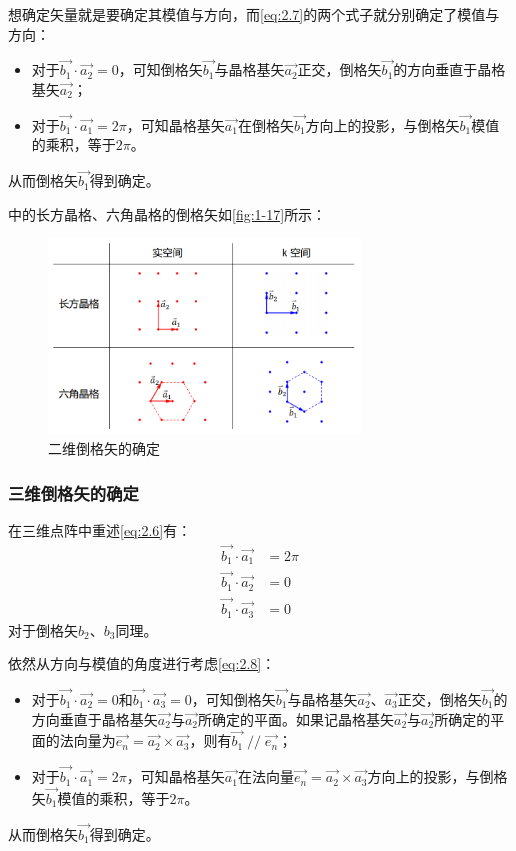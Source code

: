     想确定矢量就是要确定其模值与方向，而\autoref{eq:2.7}的两个式子就分别确定了模值与方向：
    \begin{itemize}[itemsep=0pt,parsep=0pt]
        \item 对于$\vec{b_1} \cdot \vec{a_2} = 0$，可知倒格矢$\vec{b_1}$与晶格基矢$\vec{a_2}$正交，倒格矢$\vec{b_1}$的方向垂直于晶格基矢$\vec{a_2}$；
        \item 对于$\vec{b_1} \cdot \vec{a_1} = 2\pi$，可知晶格基矢$\vec{a_1}$在倒格矢$\vec{b_1}$方向上的投影，与倒格矢$\vec{b_1}$模值的乘积，等于$2\pi$。
    \end{itemize}
    从而倒格矢$\vec{b_1}$得到确定。

    中的长方晶格、六角晶格的倒格矢如\autoref{fig:1-17}所示：
    \begin{figure}[!htbp]
        \centering    
        \includegraphics[height=14em, keepaspectratio=true]{pic/2-04}
        \caption{二维倒格矢的确定}
        \label{fig:1-17}
    \end{figure}

\subsubsection{三维倒格矢的确定}
    在三维点阵中重述\autoref{eq:2.6}有：
    \begin{subequations}\label{eq:2.8}
    \begin{align}
        \vec{b_1} \cdot \vec{a_1} &= 2\pi\\
        \vec{b_1} \cdot \vec{a_2} &= 0\\
        \vec{b_1} \cdot \vec{a_3} &= 0
    \end{align}
    \end{subequations}
    对于倒格矢$b_2$、$b_3$同理。

    依然从方向与模值的角度进行考虑\autoref{eq:2.8}：
    \begin{itemize}[itemsep=0pt,parsep=0pt]
        \item 对于$\vec{b_1} \cdot \vec{a_2} = 0$和$\vec{b_1} \cdot \vec{a_3} = 0$，可知倒格矢$\vec{b_1}$与晶格基矢$\vec{a_2}$、$\vec{a_3}$正交，倒格矢$\vec{b_1}$的方向垂直于晶格基矢$\vec{a_2}$与$\vec{a_2}$所确定的平面。如果记晶格基矢$\vec{a_2}$与$\vec{a_2}$所确定的平面的法向量为$\vec{e_n}=\vec{a_2} \times \vec{a_3}$，则有$\vec{b_1}\mathop{//}\vec{e_n}$；
        \item 对于$\vec{b_1} \cdot \vec{a_1} = 2\pi$，可知晶格基矢$\vec{a_1}$在法向量$\vec{e_n}=\vec{a_2} \times \vec{a_3}$方向上的投影，与倒格矢$\vec{b_1}$模值的乘积，等于$2\pi$。
    \end{itemize}
    从而倒格矢$\vec{b_1}$得到确定。

